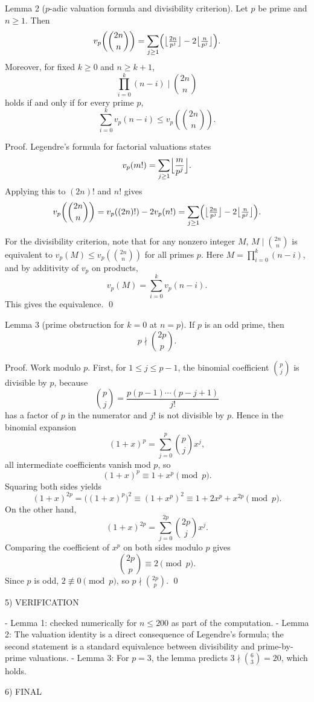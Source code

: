 Lemma 2 ($p$-adic valuation formula and divisibility criterion).
Let $p$ be prime and $n\ge 1$. Then
\[
 v_p\!\left(\binom{2n}{n}\right)=\sum_{j\ge 1}\Bigl(\bigl\lfloor\tfrac{2n}{p^j}\bigr\rfloor-2\bigl\lfloor\tfrac{n}{p^j}\bigr\rfloor\Bigr).
\]
Moreover, for fixed $k\ge 0$ and $n\ge k+1$,
\[
\prod_{i=0}^{k}(n-i)\mid\binom{2n}{n}
\]
holds if and only if for every prime $p$,
\[
\sum_{i=0}^{k} v_p(n-i)\le v_p\!\left(\binom{2n}{n}\right).
\]

Proof.
Legendre's formula for factorial valuations states
\[
 v_p(m!)=\sum_{j\ge 1}\Bigl\lfloor\frac{m}{p^j}\Bigr\rfloor.
\]
Applying this to $(2n)!$ and $n!$ gives
\[
 v_p\!\left(\binom{2n}{n}\right)=v_p((2n)!)-2v_p(n!)
 =\sum_{j\ge 1}\Bigl(\bigl\lfloor\tfrac{2n}{p^j}\bigr\rfloor-2\bigl\lfloor\tfrac{n}{p^j}\bigr\rfloor\Bigr).
\]

For the divisibility criterion, note that for any nonzero integer $M$, $M\mid\binom{2n}{n}$ is equivalent to $v_p(M)\le v_p\!\left(\binom{2n}{n}\right)$ for all primes $p$.
Here $M=\prod_{i=0}^k (n-i)$, and by additivity of $v_p$ on products,
\[
 v_p(M)=\sum_{i=0}^{k} v_p(n-i).
\]
This gives the equivalence. \qed

Lemma 3 (prime obstruction for $k=0$ at $n=p$).
If $p$ is an odd prime, then
\[
 p\nmid \binom{2p}{p}.
\]

Proof.
Work modulo $p$.
First, for $1\le j\le p-1$, the binomial coefficient $\binom{p}{j}$ is divisible by $p$, because
\[
\binom{p}{j}=\frac{p(p-1)\cdots(p-j+1)}{j!}
\]
has a factor of $p$ in the numerator and $j!$ is not divisible by $p$.
Hence in the binomial expansion
\[
(1+x)^p=\sum_{j=0}^p \binom{p}{j}x^j,
\]
all intermediate coefficients vanish mod $p$, so
\[
(1+x)^p\equiv 1+x^p\pmod p.
\]
Squaring both sides yields
\[
(1+x)^{2p}=\bigl((1+x)^p\bigr)^2\equiv (1+x^p)^2\equiv 1+2x^p+x^{2p}\pmod p.
\]
On the other hand,
\[
(1+x)^{2p}=\sum_{j=0}^{2p}\binom{2p}{j}x^j.
\]
Comparing the coefficient of $x^p$ on both sides modulo $p$ gives
\[
\binom{2p}{p}\equiv 2 \pmod p.
\]
Since $p$ is odd, $2\not\equiv 0\pmod p$, so $p\nmid \binom{2p}{p}$. \qed

5) VERIFICATION

- Lemma 1: checked numerically for $n\le 200$ as part of the computation.
- Lemma 2: The valuation identity is a direct consequence of Legendre's formula; the second statement is a standard equivalence between divisibility and prime-by-prime valuations.
- Lemma 3: For $p=3$, the lemma predicts $3\nmid\binom{6}{3}=20$, which holds.

6) FINAL

